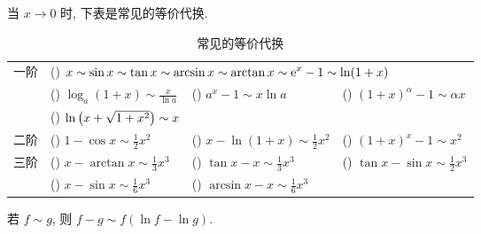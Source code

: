 当 $x\to0$ 时, 下表是常见的等价代换.
\setcounter{magicrownumbers}{0}
\begin{table}[H]
    \centering
    \caption{常见的等价代换}
    \begin{tabular}{c l l l}
        \multirow{3}{*}{一阶} & \multicolumn{3}{l}{(\rownumber{}) $\displaystyle x\sim \sin x\sim \tan x\sim \arcsin x\sim \arctan x\sim \mathrm{e} ^x-1\sim \ln(1+x)$}                                                                                                                                                  \\
                              & (\rownumber{}) $\displaystyle \log_a(1+x)\sim\frac{x}{\ln a}$                                                                   & (\rownumber{}) $\displaystyle a^x-1\sim x\ln a$              & (\rownumber{}) $\displaystyle (1+x)^\alpha-1\sim \alpha x$                      \\
                              & (\rownumber{}) $\ln\qty(x+\sqrt{1+x^2})\sim x$                                                                                                                                                                                                                                   \\
        \midrule
        二阶                  & (\rownumber{}) $\displaystyle 1-\cos x\sim\frac{1}{2}x^2$                                                                       & (\rownumber{}) $\displaystyle x-\ln(1+x)\sim\frac{1}{2}x^2$  & (\rownumber{}) $\displaystyle (1+x)^x-1\sim x^2$                                \\
        \midrule
        \multirow{2}{*}{三阶} & (\rownumber{}) $\displaystyle x-\arctan x\sim\frac{1}{3}x^3$                                                                    & (\rownumber{}) $\displaystyle \tan x-x\sim\frac{1}{3}x^3$    & \multirow{2}{*}{(\rownumber{}) $\displaystyle \tan x-\sin x\sim\frac{1}{2}x^3$} \\
                              & (\rownumber{}) $\displaystyle x-\sin x\sim\frac{1}{6}x^3$                                                                       & (\rownumber{}) $\displaystyle \arcsin x-x\sim\frac{1}{6}x^3$ &                                                                                 \\
    \end{tabular}
\end{table}

\begin{theorem}[减法无穷小代换]
    若 $f\sim g$, 则 $f-g\sim f(\ln f-\ln g)$.
    \label{fsimg}
\end{theorem}


